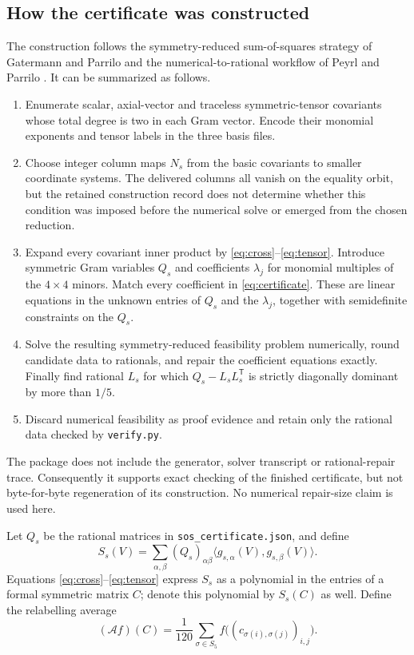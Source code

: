 \documentclass[11pt,a4paper]{article}
\newcommand{\calA}{\mathcal A}
\theoremstyle{remark}\newtheorem{remark}[theorem]{Remark}
\begin{document}
\subsection{How the certificate was constructed}
The construction follows the symmetry-reduced sum-of-squares strategy of Gatermann and Parrilo \cite{GP} and the numerical-to-rational workflow of Peyrl and Parrilo \cite{PP}. It can be summarized as follows.
\begin{enumerate}[label=\arabic*.,leftmargin=*]
\item Enumerate scalar, axial-vector and traceless symmetric-tensor covariants whose total degree is two in each Gram vector. Encode their monomial exponents and tensor labels in the three basis files.
\item Choose integer column maps $N_s$ from the basic covariants to smaller coordinate systems. The delivered columns all vanish on the equality orbit, but the retained construction record does not determine whether this condition was imposed before the numerical solve or emerged from the chosen reduction.
\item Expand every covariant inner product by \eqref{eq:cross}--\eqref{eq:tensor}. Introduce symmetric Gram variables $Q_s$ and coefficients $\lambda_j$ for monomial multiples of the $4\times4$ minors. Match every coefficient in \eqref{eq:certificate}. These are linear equations in the unknown entries of $Q_s$ and the $\lambda_j$, together with semidefinite constraints on the $Q_s$.
\item Solve the resulting symmetry-reduced feasibility problem numerically, round candidate data to rationals, and repair the coefficient equations exactly. Finally find rational $L_s$ for which $Q_s-L_sL_s^{\mathsf T}$ is strictly diagonally dominant by more than $1/5$.
\item Discard numerical feasibility as proof evidence and retain only the rational data checked by \nolinkurl{verify.py}.
\end{enumerate}
The package does not include the generator, solver transcript or rational-repair trace. Consequently it supports exact checking of the finished certificate, but not byte-for-byte regeneration of its construction. No numerical repair-size claim is used here.

Let $Q_s$ be the rational matrices in \nolinkurl{sos_certificate.json}, and define
\[
 S_s(V)=\sum_{\alpha,\beta}(Q_s)_{\alpha\beta}
       \langle g_{s,\alpha}(V),g_{s,\beta}(V)\rangle.
\]
Equations \eqref{eq:cross}--\eqref{eq:tensor} express $S_s$ as a polynomial in the entries of a formal symmetric matrix $C$; denote this polynomial by $S_s(C)$ as well. Define the relabelling average
\[
 (\calA f)(C)=\frac1{120}\sum_{\sigma\in S_5}f\bigl((c_{\sigma(i),\sigma(j)})_{i,j}\bigr).
\]
\end{document}
